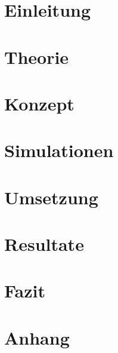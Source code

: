 \documentclass[11pt,a4paper,hidelinks]{article}
\begin{document}










\section{Einleitung}\label{sec:introduction}

\pagebreak

\section{Theorie}\label{sec:theory}

\pagebreak

\section{Konzept}\label{sec:concept}

\pagebreak

\section{Simulationen}\label{sec:simulations}

\pagebreak

\section{Umsetzung}\label{sec:realisation}

\pagebreak

\section{Resultate}\label{sec:results}

\pagebreak

\section{Fazit}\label{sec:conclusion}

\pagebreak

\section{Anhang}\label{sec:appendix}




\end{document}
